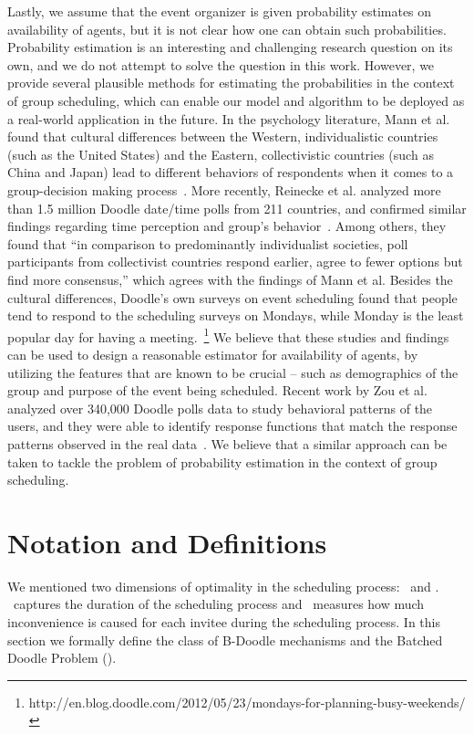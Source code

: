 Lastly, we assume that the event organizer is given probability estimates on availability of agents, but it is not clear how one can obtain such probabilities. 
 Probability estimation is an interesting and challenging research question on its own, and we do not attempt to solve the question in this work. However, we provide several plausible methods for estimating the probabilities in the context of group scheduling, which can enable our model and algorithm to be deployed as a real-world application in the future.
 In the psychology literature, Mann et al. found that cultural differences between the Western, individualistic countries (such as the United States) and the Eastern, collectivistic countries (such as China and Japan) lead to different behaviors of respondents when it comes to a group-decision making process~\cite{mann1998cross}.
 More recently, Reinecke et al. analyzed more than 1.5 million Doodle date/time polls from 211 countries, and confirmed similar findings regarding time perception and group's behavior~\cite{reinecke2013doodle}. Among others, they found that ``in comparison to predominantly individualist societies, poll participants from collectivist countries respond earlier, agree to fewer options but find more consensus,'' which agrees with the findings of Mann et al.
 Besides the cultural differences, Doodle's own surveys on event scheduling found that people tend to respond to the scheduling surveys on Mondays, while Monday is the least popular day for having a meeting.~\footnote{http://en.blog.doodle.com/2012/05/23/mondays-for-planning-busy-weekends/}
 We believe that these studies and findings can be used to design a reasonable estimator for availability of agents, by utilizing the features that are known to be crucial -- such as demographics of the group and purpose of the event being scheduled.
 Recent work by Zou et al. analyzed over 340,000 Doodle polls data to study behavioral patterns of the users, and they were able to identify response functions that match the response patterns observed in the real data~\cite{zou2015strategic}. We believe that a similar approach can be taken to tackle the problem of probability estimation in the context of group scheduling.


\section{Notation and Definitions}

We mentioned two dimensions of optimality in the scheduling process: \Time\ and \Inconvenience.
\Time\ captures the duration of the scheduling process and \Inconvenience\ measures how much inconvenience is caused for each invitee during the scheduling process.
In this section we formally define the class of B-Doodle mechanisms and the Batched Doodle Problem (\BDP).

